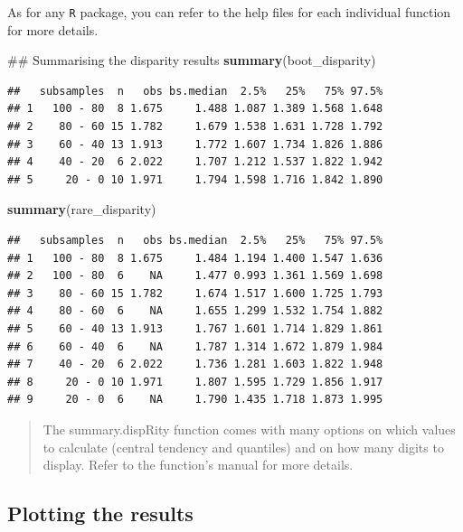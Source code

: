 \documentclass[]{book}
\newenvironment{Shaded}{\begin{snugshade}}{\end{snugshade}}
\newcommand{\KeywordTok}[1]{\textcolor[rgb]{0.13,0.29,0.53}{\textbf{#1}}}
\newcommand{\NormalTok}[1]{#1}
\theoremstyle{definition}
\theoremstyle{definition}
\theoremstyle{remark}
\begin{document}
As for any \texttt{R} package, you can refer to the help files for each
individual function for more details.

\begin{Shaded}
\begin{Highlighting}[]
\NormalTok{## Summarising the disparity results}
\KeywordTok{summary}\NormalTok{(boot_disparity)}
\end{Highlighting}
\end{Shaded}

\begin{verbatim}
##   subsamples  n   obs bs.median  2.5%   25%   75% 97.5%
## 1   100 - 80  8 1.675     1.488 1.087 1.389 1.568 1.648
## 2    80 - 60 15 1.782     1.679 1.538 1.631 1.728 1.792
## 3    60 - 40 13 1.913     1.772 1.607 1.734 1.826 1.886
## 4    40 - 20  6 2.022     1.707 1.212 1.537 1.822 1.942
## 5     20 - 0 10 1.971     1.794 1.598 1.716 1.842 1.890
\end{verbatim}

\begin{Shaded}
\begin{Highlighting}[]
\KeywordTok{summary}\NormalTok{(rare_disparity)}
\end{Highlighting}
\end{Shaded}

\begin{verbatim}
##   subsamples  n   obs bs.median  2.5%   25%   75% 97.5%
## 1   100 - 80  8 1.675     1.484 1.194 1.400 1.547 1.636
## 2   100 - 80  6    NA     1.477 0.993 1.361 1.569 1.698
## 3    80 - 60 15 1.782     1.674 1.517 1.600 1.725 1.793
## 4    80 - 60  6    NA     1.655 1.299 1.532 1.754 1.882
## 5    60 - 40 13 1.913     1.767 1.601 1.714 1.829 1.861
## 6    60 - 40  6    NA     1.787 1.314 1.672 1.879 1.984
## 7    40 - 20  6 2.022     1.736 1.281 1.603 1.822 1.948
## 8     20 - 0 10 1.971     1.807 1.595 1.729 1.856 1.917
## 9     20 - 0  6    NA     1.790 1.435 1.718 1.873 1.995
\end{verbatim}

\begin{quote}
The summary.dispRity function comes with many options on which values to
calculate (central tendency and quantiles) and on how many digits to
display. Refer to the function's manual for more details.
\end{quote}

\subsection{Plotting the results}\label{plotting-the-results}
\end{document}
